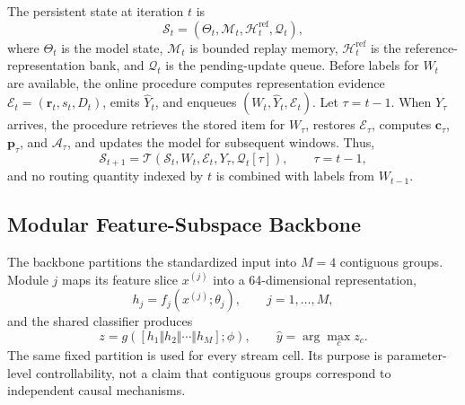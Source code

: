 \documentclass{ieeeaccess}
\begin{document}
The persistent state at iteration $t$ is
\begin{equation}
\mathcal{S}_t=\left(\Theta_t,\mathcal{M}_t,\mathcal{H}^{\mathrm{ref}}_t,\mathcal{Q}_t\right),
\label{eq:system-state}
\end{equation}
where $\Theta_t$ is the model state, $\mathcal{M}_t$ is bounded replay memory, $\mathcal{H}^{\mathrm{ref}}_t$ is the reference-representation bank, and $\mathcal{Q}_t$ is the pending-update queue. Before labels for $W_t$ are available, the online procedure computes representation evidence $\mathcal{E}_t=(\mathbf r_t,s_t,D_t)$, emits $\hat Y_t$, and enqueues $(W_t,\hat Y_t,\mathcal{E}_t)$. Let $\tau=t-1$. When $Y_{\tau}$ arrives, the procedure retrieves the stored item for $W_{\tau}$, restores $\mathcal{E}_{\tau}$, computes $\mathbf c_{\tau}$, $\mathbf p_{\tau}$, and $\mathcal A_{\tau}$, and updates the model for subsequent windows. Thus,
\begin{equation}
\mathcal{S}_{t+1}=\mathcal{T}\!\left(\mathcal{S}_t,W_t,\mathcal{E}_t,Y_{\tau},\mathcal{Q}_t[\tau]\right),\qquad \tau=t-1,
\label{eq:state-transition}
\end{equation}
and no routing quantity indexed by $t$ is combined with labels from $W_{t-1}$.

\subsection{Modular Feature-Subspace Backbone}
The backbone partitions the standardized input into $M=4$ contiguous groups. Module $j$ maps its feature slice $x^{(j)}$ into a 64-dimensional representation,
\begin{equation}
h_j=f_j(x^{(j)};\theta_j),\qquad j=1,\ldots,M,
\label{eq:module}
\end{equation}
and the shared classifier produces
\begin{equation}
z=g([h_1\Vert h_2\Vert\cdots\Vert h_M];\phi),\qquad
\hat y=\arg\max_c z_c.
\label{eq:classifier}
\end{equation}
The same fixed partition is used for every stream cell. Its purpose is parameter-level controllability, not a claim that contiguous groups correspond to independent causal mechanisms.
\end{document}
